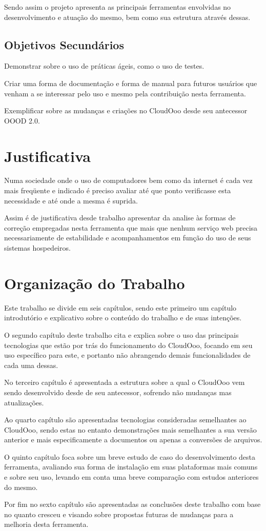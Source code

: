 Sendo assim o projeto apresenta as principais ferramentas envolvidas no desenvolvimento e atuação do mesmo, bem como sua estrutura através dessas.

\subsection{Objetivos Secundários}

Demonstrar sobre o uso de práticas ágeis, como o uso de testes.

Criar uma forma de documentação e forma de manual para futuros usuários que venham a se interessar pelo uso e mesmo pela contribuição nesta ferramenta.

Exemplificar sobre as mudanças e criações no CloudOoo desde seu antecessor OOOD 2.0.


\section{Justificativa}

Numa sociedade onde o uso de computadores bem como da internet é cada vez mais freqüente e indicado é preciso avaliar até que ponto verificasse esta necessidade e até onde a mesma é suprida.

Assim é de justificativa desde trabalho apresentar da analise às formas de correção empregadas nesta ferramenta que mais que nenhum serviço web precisa necessariamente de estabilidade e acompanhamentos em função do uso de seus sistemas hospedeiros.


\section{Organização do Trabalho}

Este trabalho se divide em seis capítulos, sendo este primeiro um capítulo introdutório e explicativo sobre o conteúdo do trabalho e de suas intenções.

O segundo capítulo deste trabalho cita e explica sobre o uso das principais tecnologias que estão por trás do funcionamento do CloudOoo, focando em seu uso específico para este, e portanto não abrangendo demais funcionalidades de cada uma dessas.

No terceiro capítulo é apresentada a estrutura sobre a qual o CloudOoo vem sendo desenvolvido desde de seu antecessor, sofrendo não mudanças mas atualizações.

Ao quarto capítulo são apresentadas tecnologias consideradas semelhantes ao CloudOoo, sendo estas no entanto demonstrações mais semelhantes a sua versão anterior e mais especificamente a documentos ou apenas a conversões de arquivos.

O quinto capítulo foca sobre um breve estudo de caso do desenvolvimento desta ferramenta, avaliando sua forma de instalação em suas plataformas mais comuns e sobre seu uso, levando em conta uma breve comparação com estudos anteriores do mesmo.

Por fim no sexto capítulo são apresentadas as conclusões deste trabalho com base no quanto cresceu e visando sobre propostas futuras de mudanças para a melhoria desta ferramenta.
